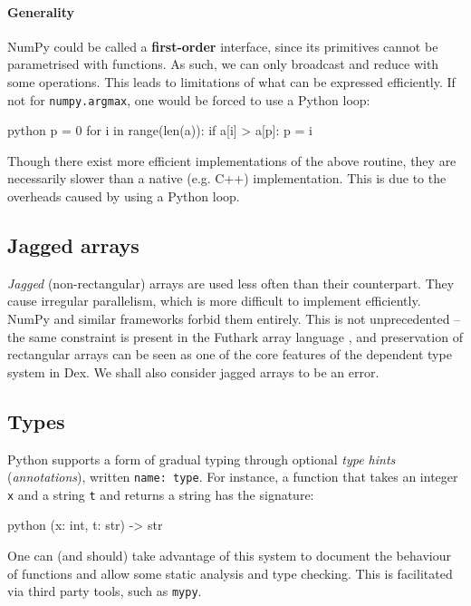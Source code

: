 \paragraph{Generality} NumPy could be called a \textbf{first-order} interface, since its primitives cannot be parametrised with functions. As such, we can only broadcast and reduce with some operations. This leads to limitations of what can be expressed efficiently. If not for \texttt{numpy.argmax}, one would be forced to use a Python loop:
\begin{center}
\begin{cminted}{python}
p = 0
for i in range(len(a)): 
    if a[i] > a[p]: p = i
\end{cminted}
\end{center}
Though there exist more efficient implementations of the above routine, they are necessarily slower than a native (e.g. C++) implementation. This is due to the overheads caused by using a Python loop.

\subsection{Jagged arrays}

\textit{Jagged} (non-rectangular) arrays are used less often than their counterpart. 
They cause irregular parallelism, which is more difficult to implement efficiently. 
NumPy and similar frameworks forbid them entirely. This is not unprecedented -- the same constraint is present in the Futhark array language \cite{henriksen2017futhark}, and preservation of rectangular arrays can be seen as one of the core features of the dependent type system in Dex. We shall also consider jagged arrays to be an error.

\subsection{Types}

Python supports a form of gradual typing through optional \textit{type hints} (\textit{annotations}), written \texttt{name: type}. For instance, a function that takes an integer \texttt{x} and a string \texttt{t} and returns a string has the signature:
\begin{center}
\begin{cminted}{python}
(x: int, t: str) -> str
\end{cminted}
\end{center}
One can (and should) take advantage of this system to document the behaviour of functions and allow some static analysis and type checking. This is facilitated via third party tools, such as \texttt{mypy}.

